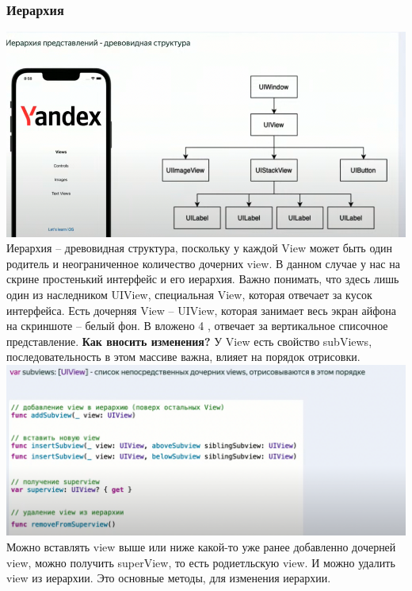 \documentclass{article}
\begin{document}
    \subsubsection{Иерархия}
    \includegraphics[scale = 0.5]{pic/Снимок экрана 2023-07-31 в 20.13.37.png}
    \newline
    Иерархия -- древовидная структура, поскольку у каждой View может быть один родитель и неограниченное количество дочерних view. В данном случае у нас на скрине простенький интерфейс и его иерархия. 
    \newline
    Важно понимать, что здесь лишь один из наследником UIView, специальная View, которая отвечает за кусок интерфейса. Есть дочерняя View -- UIView, которая занимает весь экран айфона на скриншоте -- белый фон. В  вложено 4 , отвечает за вертикальное списочное представление. 
    \newline
    \textbf{Как вносить изменения? }
    \newline
    У View есть свойство subViews, последовательность в этом массиве важна, влияет на порядок отрисовки. 
    \newline
    \includegraphics[scale = 0.3]{pic/Снимок экрана 2023-07-31 в 20.17.30.png}
    \newline
    Можно вставлять  view выше или ниже какой-то уже ранее добавленно дочерней view, можно получить superView, то есть родиетльскую view. И можно удалить view из иерархии. Это основные методы, для изменения иерархии. 
\end{document}
